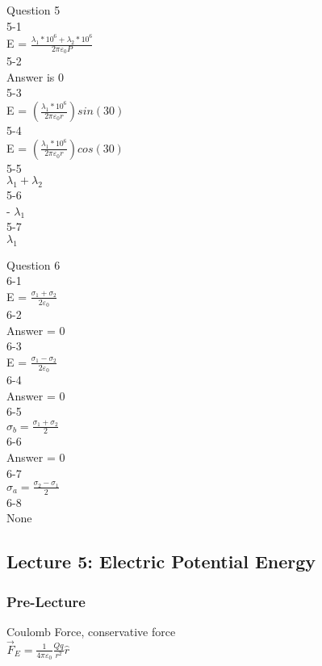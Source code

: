 \documentclass{article}
\begin{document}
\noindent
Question 5 \\
5-1 \\
E = $\frac{\lambda_1*10^6 + \lambda_2*10^6}{2 \pi \varepsilon_0 P}$ \\
5-2 \\
Answer is 0 \\
5-3 \\
E = $(\frac{\lambda_1*10^6}{2 \pi \varepsilon_0 r}) sin(30)$ \\
5-4 \\
E =  $(\frac{\lambda_1*10^6}{2 \pi \varepsilon_0 r}) cos(30)$ \\
5-5 \\
$\lambda_1 + \lambda_2$ \\
5-6 \\
- $\lambda_1$ \\
5-7 \\
$\lambda_1$

\vspace{2mm}

\noindent
Question 6 \\
6-1 \\
E = $\frac{\sigma_1 + \sigma_2}{2 \varepsilon_0}$ \\
6-2 \\
Answer = 0 \\
6-3 \\
E = $\frac{\sigma_1-\sigma_2}{2 \varepsilon_0}$ \\
6-4 \\
Answer = 0 \\
6-5 \\
$\sigma_b = \frac{\sigma_1 + \sigma_2}{2}$ \\
6-6 \\
Answer = 0 \\
6-7 \\
$\sigma_a = \frac{\sigma_2 - \sigma_1}{2}$ \\
6-8 \\
None 

\subsection{Lecture 5: Electric Potential Energy}

\subsubsection{Pre-Lecture}
\noindent
Coulomb Force, conservative force \\
$\vec{F}_E = \frac{1}{4 \pi \varepsilon_0} \frac{Qq}{r^2} \hat{r}$
\end{document}
